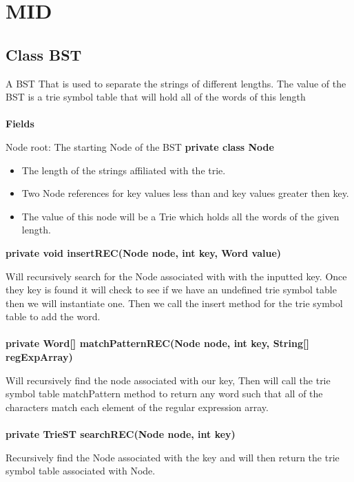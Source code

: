 \documentclass[11pt]{article}
\begin{document}
\newpage
\section{MID}
\subsection{Class BST }

A BST That is used to separate the strings of different lengths. The value of the BST is a trie symbol table that will hold all of the words of this length\\\\
\textbf{Fields\\}

Node root: The starting Node of the BST
\textbf{private class Node\\}
\begin{itemize}
	\item The length of the strings affiliated with the trie.
	\item Two Node references for key values less than and key values greater then key.
	\item The value of this node will be a Trie which holds all the words of the given length.
\end{itemize}

\textbf{private void insertREC(Node node, int key, Word value)\\}

Will recursively search for the Node associated with with the inputted key. Once they key is found it will check to see if we have an undefined trie symbol table then we will instantiate one. Then we call the insert method for the trie symbol table to add the word.\\\\
\textbf{private Word[] matchPatternREC(Node node, int key, String[] regExpArray)\\}

Will recursively find the node associated with our key, Then will call the trie symbol table matchPattern method to return any word such that all of the characters match each element of the regular expression array. \\\\
\textbf{private TrieST searchREC(Node node, int key)\\}

Recursively find the Node associated with the key and will then return the trie symbol table associated with Node.\\\\
\end{document}
